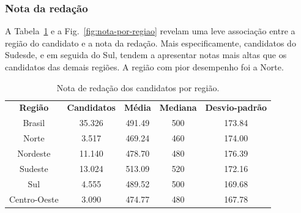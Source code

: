\documentclass[12pt]{article}
\newcommand{\reffig}[1]{Fig.~\ref{fig:#1}}
\newcommand{\reftab}[1]{Tabela~\ref{tab:#1}}
\begin{document}
\subsubsection{Nota da redação}
A \reftab{nota-por-regiao} e a \reffig{nota-por-regiao} revelam uma leve associação entre a região do candidato e a nota da redação. Mais especificamente, candidatos do Sudesde, e em seguida do Sul, tendem a apresentar notas mais altas que os candidatos das demais regiões. A região com pior desempenho foi a Norte.

\begin{minipage}{.5\textwidth}
    \begin{table}[H]
    \begin{tabular}{ c c c c c }
      \textbf{Região}  & \textbf{Candidatos} & \textbf{Média} & \textbf{Mediana} & \textbf{Desvio-padrão} \\
      Brasil           & 35.326              & 491.49          & 500             & 173.84 \\
      Norte            & 3.517               & 469.24          & 460             & 174.00 \\
      Nordeste         & 11.140              & 478.70          & 480             & 176.39 \\
      Sudeste          & 13.024              & 513.09          & 520             & 172.16 \\
      Sul              & 4.555               & 489.52          & 500             & 169.68 \\
      Centro-Oeste     & 3.090               & 474.77          & 480             & 167.78 \\
    \end{tabular}
    \caption{Nota de redação dos candidatos por região.}
    \label{tab:nota-por-regiao}
    \end{table}
\end{minipage}%
\end{document}
